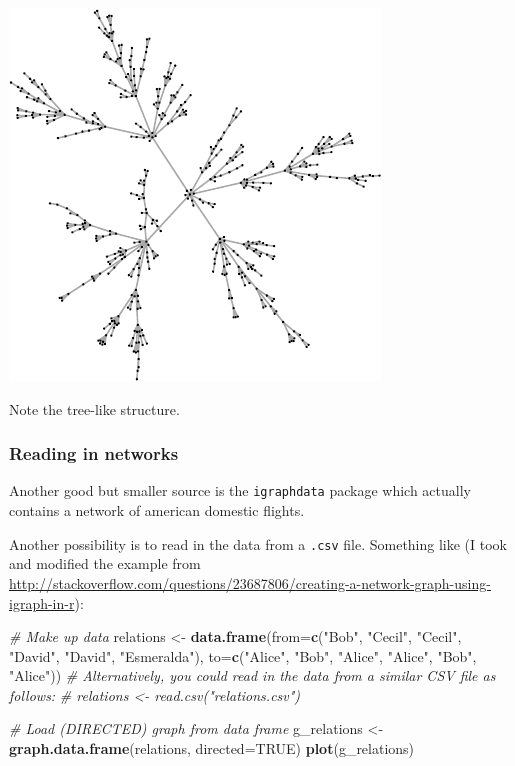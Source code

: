 \documentclass[]{article}
\newenvironment{Shaded}{\begin{snugshade}}{\end{snugshade}}
\newcommand{\KeywordTok}[1]{\textcolor[rgb]{0.13,0.29,0.53}{\textbf{#1}}}
\newcommand{\DataTypeTok}[1]{\textcolor[rgb]{0.13,0.29,0.53}{#1}}
\newcommand{\StringTok}[1]{\textcolor[rgb]{0.31,0.60,0.02}{#1}}
\newcommand{\CommentTok}[1]{\textcolor[rgb]{0.56,0.35,0.01}{\textit{#1}}}
\newcommand{\OtherTok}[1]{\textcolor[rgb]{0.56,0.35,0.01}{#1}}
\newcommand{\NormalTok}[1]{#1}
\theoremstyle{definition}
\theoremstyle{definition}
\theoremstyle{definition}
\theoremstyle{remark}
\begin{document}
\includegraphics{ResearchTools_files/figure-latex/unnamed-chunk-56-1.pdf}

Note the tree-like structure.

\subsubsection{Reading in networks}\label{reading-in-networks}

Another good but smaller source is the \texttt{igraphdata} package which
actually contains a network of american domestic flights.

Another possibility is to read in the data from a \texttt{.csv} file.
Something like (I took and modified the example from
\url{http://stackoverflow.com/questions/23687806/creating-a-network-graph-using-igraph-in-r}):

\begin{Shaded}
\begin{Highlighting}[]
\CommentTok{# Make up data}
\NormalTok{relations <-}\StringTok{ }\KeywordTok{data.frame}\NormalTok{(}\DataTypeTok{from=}\KeywordTok{c}\NormalTok{(}\StringTok{"Bob"}\NormalTok{, }\StringTok{"Cecil"}\NormalTok{, }\StringTok{"Cecil"}\NormalTok{, }\StringTok{"David"}\NormalTok{, }\StringTok{"David"}\NormalTok{, }\StringTok{"Esmeralda"}\NormalTok{),}
                        \DataTypeTok{to=}\KeywordTok{c}\NormalTok{(}\StringTok{"Alice"}\NormalTok{, }\StringTok{"Bob"}\NormalTok{, }\StringTok{"Alice"}\NormalTok{, }\StringTok{"Alice"}\NormalTok{, }\StringTok{"Bob"}\NormalTok{, }\StringTok{"Alice"}\NormalTok{))}
\CommentTok{# Alternatively, you could read in the data from a similar CSV file as follows:}
\CommentTok{# relations <- read.csv("relations.csv")}

\CommentTok{# Load (DIRECTED) graph from data frame }
\NormalTok{g_relations <-}\StringTok{ }\KeywordTok{graph.data.frame}\NormalTok{(relations, }\DataTypeTok{directed=}\OtherTok{TRUE}\NormalTok{)}
\KeywordTok{plot}\NormalTok{(g_relations)}
\end{Highlighting}
\end{Shaded}
\end{document}
